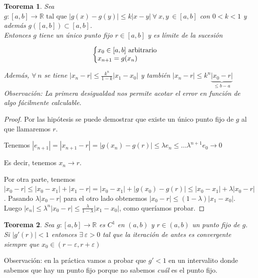 \documentclass[10pt,a4paper,final]{report}
\newtheorem{theorem}{Teorema}
\def\R{\mathbb{R}}
\begin{document}
{\begin{theorem}
Sea $g :[a,b] \rightarrow \R\text{ tal que }|g(x)-g(y)|\leq k |x-y|\ \forall\ x,y\ \in [a,b]$ con $0<k<1$ y además $g([a,b]) \subset [a,b]$. \\

Entonces $g$ tiene un único punto fijo $r \in [a,b]$ y es límite de la sucesión

\begin{equation}
  \left\{
  \begin{array}{@{}ll@{}}
    x_0 \in [a,b] \text{ arbitrario} \\
    x_{n+1} = g(x_n)
  \end{array}\right.
\end{equation} 

Además, $\forall\ n$ se tiene $|x_n-r| \leq \frac{k^n}{1-k} |x_1-x_0|$ y también $|x_n-r|\leq k^n \underbrace{|x_0 -r|}_{\leq b-a}$ \\

Observación: La primera desigualdad nos permite acotar el error en función de algo fácilmente calculable.
\end{theorem} 

\begin{proof}
	Por las hipótesis se puede demostrar que existe un único punto fijo de $g$ al que llamaremos $r$.
	
	Tenemos $|e_{n+1}| = |x_{n+1} - r |= |g(x_n) - g(r)| \leq \lambda e_n  \leq ... \lambda^{n+1} e_0 \to 0$
	
	Es decir, tenemos $x_n \to r$.
	
	Por otra parte, tenemos $|x_0 - r| \leq |x_0 - x_1| + |x_1 - r| = |x_0 - x_1| + |g(x_0) - g(r)| \leq |x_0 - x_1| + \lambda |x_0 - r|$. Pasando $\lambda |x_0-r|$ para el otro lado obtenemos $|x_0-r| \leq (1-\lambda) |x_1-x_0|$. Luego $|e_n| \leq \lambda^n |x_0 - r| \leq \frac{\lambda}{1-\lambda} |x_1-x_0|$, como queríamos probar. 
\end{proof}


\begin{theorem}  Sea  $g :[a,b] \rightarrow \R$ es $C^1$ en $(a,b)$ y $r\in(a,b)$ un punto fijo de $g$. Si $|g'(r)|<1$ entonces $\exists\ \varepsilon>0$ tal que la iteración de antes es convergente siempre que $x_0 \in (r-\varepsilon,r+\varepsilon)$
\end{theorem} 

Observación: en la práctica vamos a probar que $g' < 1$ en un intervalito donde sabemos que hay un punto fijo porque no sabemos \textit{cuál} es el punto fijo.

}
\end{document}
